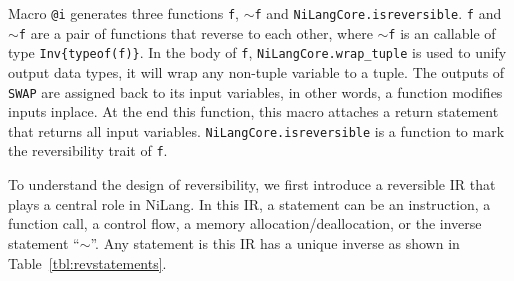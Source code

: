 \documentclass[aps,twocolumn,longbibliography,english,superscriptaddress]{revtex4-1}
\newcommand{\<}{\langle}
\renewcommand{\>}{\rangle}
\newcommand{\Tbl}[1]{Table~\ref{#1}}
\theoremstyle{definition}\newtheorem{definition}{\textit{Definition}}
\begin{document}
Macro \texttt{@i} generates three functions \texttt{f}, \texttt{$\sim$f} and \texttt{NiLangCore.isreversible}. \texttt{f} and \texttt{$\sim$f} are a pair of functions that reverse to each other, where \texttt{$\sim$f} is an callable of type \texttt{Inv\{typeof(f)\}}.
In the body of \texttt{f}, \texttt{NiLangCore.wrap\_tuple} is used to unify output data types, it will wrap any non-tuple variable to a tuple.
The outputs of \texttt{SWAP} are assigned back to its input variables, in other words, a function modifies inputs inplace.
At the end this function, this macro attaches a return statement that returns all input variables.
\texttt{NiLangCore.isreversible} is a function to mark the reversibility trait of \texttt{f}.

To understand the design of reversibility, we first introduce a reversible IR that plays a central role in NiLang.
In this IR, a statement can be an instruction, a function call, a control flow, a memory allocation/deallocation, or the inverse statement ``$\sim$''.
Any statement is this IR has a unique inverse as shown in \Tbl{tbl:revstatements}.
\end{document}
